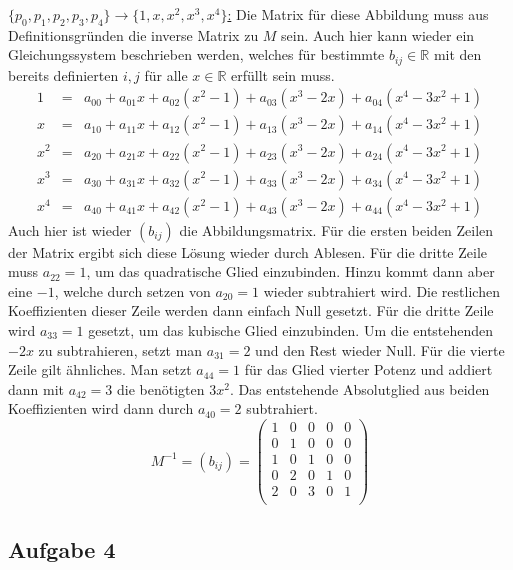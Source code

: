\documentclass[10pt, a4paper]{article}
\begin{document}
		\underline{$\{p_0,p_1,p_2,p_3,p_4\} \longrightarrow \{1,x,x^2,x^3,x^4\}$:}
		Die Matrix für diese Abbildung muss aus Definitionsgründen die inverse Matrix zu $M$ sein. Auch hier kann wieder ein Gleichungssystem beschrieben werden, welches für bestimmte $b_{ij} \in \mathbb{R}$ mit den bereits definierten $i,j$ für alle $x \in \mathbb{R}$ erfüllt sein muss.
		\begin{eqnarray*}
			1 &=& a_{00} + a_{01}x + a_{02}(x^2-1) + a_{03}(x^3-2x) +a_{04}(x^4-3x^2+1) \\
			x &=& a_{10} + a_{11}x + a_{12}(x^2-1) + a_{13}(x^3-2x) +a_{14}(x^4-3x^2+1) \\
			x^2 &=& a_{20} + a_{21}x + a_{22}(x^2-1) + a_{23}(x^3-2x) +a_{24}(x^4-3x^2+1) \\
			x^3 &=& a_{30} + a_{31}x + a_{32}(x^2-1) + a_{33}(x^3-2x) +a_{34}(x^4-3x^2+1) \\
			x^4 &=& a_{40} + a_{41}x + a_{42}(x^2-1) + a_{43}(x^3-2x) +a_{44}(x^4-3x^2+1) 
		\end{eqnarray*}
		Auch hier ist wieder $(b_{ij})$ die Abbildungsmatrix. Für die ersten beiden Zeilen der Matrix ergibt sich diese Lösung wieder durch Ablesen.
		Für die dritte Zeile muss $a_{22}=1$, um das quadratische Glied einzubinden. Hinzu kommt dann aber eine $-1$, welche durch setzen von $a_{20}=1$ wieder subtrahiert wird. Die restlichen Koeffizienten dieser Zeile werden dann einfach Null gesetzt. Für die dritte Zeile wird $a_{33} = 1$ gesetzt, um das kubische Glied einzubinden. Um die entstehenden $-2x$ zu subtrahieren, setzt man $a_{31} = 2$ und den Rest wieder Null. Für die vierte Zeile gilt ähnliches. Man setzt $a_{44}=1$ für das Glied vierter Potenz und addiert dann mit $a_{42}=3$ die benötigten $3x^2$. Das entstehende Absolutglied aus beiden Koeffizienten wird dann durch $a_{40} = 2$ subtrahiert.
		\[
			M^{-1} = (b_{ij}) = 
			\begin{pmatrix}
				1 & 0 & 0 & 0 & 0 \\
				0 & 1 & 0 & 0 & 0 \\
				1 & 0 & 1 & 0 & 0 \\
				0 & 2 & 0 & 1 & 0 \\
				2 & 0 & 3 & 0 & 1 \\
			\end{pmatrix}
		\]


	\newpage

	\subsection*{Aufgabe 4} %
	\label{sub:aufgabe_4}
\end{document}
